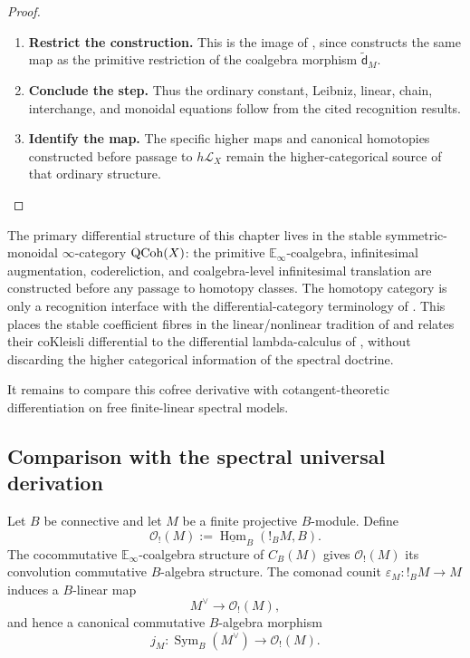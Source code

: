 \begin{proof}
\begin{enumerate}[label=\textup{(\arabic*)}]
    \item \textbf{Restrict the construction.}
    This is the image of , since
     constructs the same map as the
    primitive restriction of the coalgebra morphism \(\widetilde{\mathsf d}_M\).

    \item \textbf{Conclude the step.}
    Thus the ordinary constant, Leibniz, linear, chain, interchange, and monoidal equations
    follow from the cited recognition results.

    \item \textbf{Identify the map.}
    The specific higher maps and canonical homotopies constructed before passage to \(h\mathcal L_X\)
    remain the higher-categorical source of that ordinary structure.
\end{enumerate}
\end{proof}

\begin{remark}
\label{rem:tangent-differential-linear-logic}
The primary differential structure of this chapter lives in the stable
symmetric-monoidal \(\infty\)-category \(\operatorname{QCoh}(X)\): the primitive
\(\mathbb E_\infty\)-coalgebra, infinitesimal augmentation, codereliction, and
coalgebra-level infinitesimal translation are constructed before any passage
to homotopy classes. The homotopy category is only a recognition interface
with the differential-category terminology of
\cite{BluteCockettSeely2006Differential,Lemay2021Coderelictions}. This places
the stable coefficient fibres in the linear/nonlinear tradition of
\cite{Benton1995LNL} and relates their coKleisli differential to the
differential lambda-calculus of \cite{EhrhardRegnier2003Differential}, without
discarding the higher categorical information of the spectral doctrine.
\end{remark}
It remains to compare this cofree derivative with cotangent-theoretic
differentiation on free finite-linear spectral models.

\subsection{Comparison with the spectral universal derivation}

\begin{definition}
\label{def:cofree-function-algebra}
Let \(B\) be connective and let \(M\) be a finite projective \(B\)-module.
Define
\[
    \mathcal O_!(M)
    :=
    \underline{\operatorname{Hom}}_B(!_BM,B).
\]
The cocommutative \(\mathbb E_\infty\)-coalgebra structure of \(C_B(M)\)
gives \(\mathcal O_!(M)\) its convolution commutative \(B\)-algebra structure.
The comonad counit \(\varepsilon_M:!_BM\to M\) induces a \(B\)-linear map
\[
    M^\vee\longrightarrow\mathcal O_!(M),
\]
and hence a canonical commutative \(B\)-algebra morphism
\[
    j_M:
    \operatorname{Sym}_B(M^\vee)
    \longrightarrow
    \mathcal O_!(M).
\]
\end{definition}

